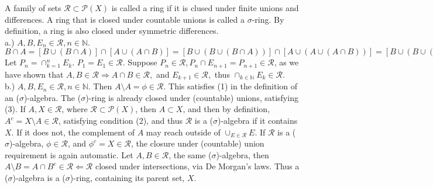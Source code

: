 \documentclass[12pt]{article}
\begin{document}
\begin{flushleft}
A family of sets $\mathcal{R} \subset \mathcal{P}(X)$ is called a ring if it is clused under finite unions and differences. A ring that is closed under countable unions is called a $\sigma$-ring. By definition, a ring is also closed under symmetric differences.\\
a.) $A,B,E_n \in \mathcal{R}, n\in \mathbb{N}$. \\
 $ B \cap A = \left[ B \cup ( B \cap A ) \right] \cap \left[ A \cup ( A \cap B ) \right] =
\left[ B \cup ( B \cup ( B \cap A )) \right] \cap \left[ A \cup ( A \cup ( A \cap B )) \right] = 
\left[ B \cup ( B \cup ( B \cap A )) \right] \cap \left[ A \cup ( A \cup ( A \cap B )) \right] = 
 \left[ B \cup ( ( B \cap A ) \cup ( B \cap B ) ) \right] \cap \left[ A \cup ( ( A \cap B ) \cup ( A \cap A ) ) \right] = 
 \left[ ( B \cap ( A \cup B ) ) \cup ( ( B \cap A ) \cup ( B \cap B ) ) \right] \cap \left[ ( A \cap ( A \cup B ) ) \cup ( ( A \cap B ) \cup ( A \cap A ) ) \right] = 
 \left[ ( B \cap ( A \cup B ) ) \cup ( ( B \cap A ) \setminus A ) \right] \cap \left[ ( A \cap ( A \cup B ) ) \cup ( ( A \cap B ) \setminus B ) ) \right] =  
 \left[ ( A \cup B ) \setminus ( A \setminus B ) \right] \cap \left[ ( a \cup B  ) \setminus ( B \setminus A ) \right] = 
  ( A \cup B ) \setminus (( A \setminus B) \cup ( B \setminus A ) )  = ( A \cup B ) \setminus ( A \Delta B ) \in \mathcal{R} $\\
Let $P_n = \cap_{k=1}^n E_k$. $P_1 = E_1 \in \mathcal{R}$. Suppose $P_n \in \mathcal{R}, P_n \cap E_{n+1} = P_{n+1} \in \mathcal{R}$, as we have shown that $A,B \in  \mathcal{R} \Rightarrow A \cap B \in \mathcal{R}, $ and $ E_{k+1} \in \mathcal{R}, $ thus $ \cap_{k \in \mathbb{N}} E_k \in \mathcal{R}$. \\
b.) $A,B,E_n \in \mathcal{R}, n\in \mathbb{N}$. Then $A \setminus A = \phi \in \mathcal{R}$. This satisfies (1) in the definition of an ($\sigma$)-algebra. The ($\sigma$)-ring is already closed under (countable) unions, satisfying (3). If $A,X \in \mathcal{R}$, where $\mathcal{R} \subset \mathcal{P}(X)$, then $A \subset X$, and then by definition, $A^c = X \setminus A \in \mathcal{R}$, satisfying condition (2), and thus $\mathcal{R}$ is a ($\sigma$)-algebra if it contains $X$. If it does not, the complement of $A$ may reach outside of $\cup_{E\in\mathcal{R}} E$. 
If $\mathcal{R}$ is a ($\sigma$)-algebra, $\phi \in \mathcal{R}$, and $\phi^c = X \in \mathcal{R}$, the closure under (countable) union requirement is again automatic. Let $A,B \in \mathcal{R}$, the same ($\sigma$)-algebra, then $A \setminus B = A \cap B^c \in \mathcal{R} \Leftarrow \mathcal{R}$ closed under intersections, via De Morgan's laws. Thus a ($\sigma$)-algebra is a ($\sigma$)-ring, containing its parent set, $X$.\\

\end{flushleft}
\end{document}
